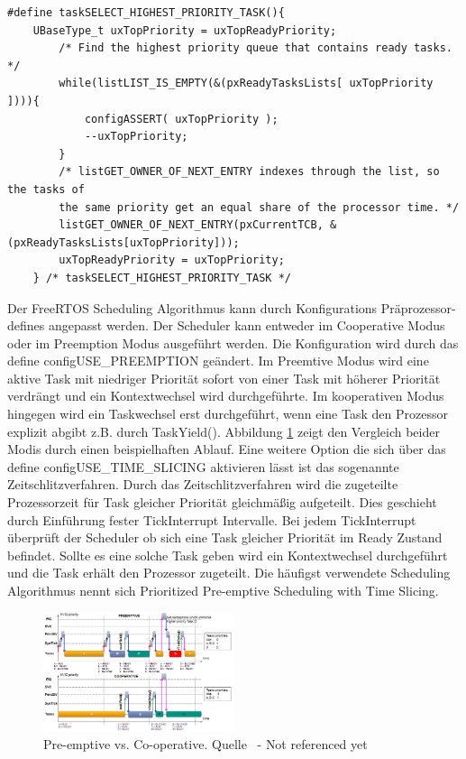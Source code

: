 \begin{lstlisting}[caption={FreeRTOS Source zur Priroty Task Selection aus Task.c. Alle lauffähigen Task werden in einem Array vewaltet pxReadyTaskLists. Die Listen verwalten sich durch Referenz-Pointer in den TCBs der einzelnen Tasks}, linewidth=8cm,captionpos=b, label=lst:nextTask, float=hbt]
#define taskSELECT_HIGHEST_PRIORITY_TASK(){																									
	UBaseType_t uxTopPriority = uxTopReadyPriority;														
		/* Find the highest priority queue that contains ready tasks. */								
		while(listLIST_IS_EMPTY(&(pxReadyTasksLists[ uxTopPriority ]))){																								
			configASSERT( uxTopPriority );																
			--uxTopPriority;																			
		}																								
		/* listGET_OWNER_OF_NEXT_ENTRY indexes through the list, so the tasks of						
		the	same priority get an equal share of the processor time. */									
		listGET_OWNER_OF_NEXT_ENTRY(pxCurrentTCB, &(pxReadyTasksLists[uxTopPriority]));			
		uxTopReadyPriority = uxTopPriority;																
	} /* taskSELECT_HIGHEST_PRIORITY_TASK */
\end{lstlisting}
Der FreeRTOS Scheduling Algorithmus kann durch Konfigurations Präprozessor-defines angepasst werden. Der Scheduler kann entweder im Cooperative Modus oder im Preemption Modus ausgeführt werden. Die Konfiguration wird durch das define configUSE\_PREEMPTION geändert. Im Preemtive Modus wird eine aktive Task mit niedriger Priorität sofort von einer Task mit höherer Priorität verdrängt und ein Kontextwechsel wird durchgeführte. Im kooperativen Modus hingegen wird ein Taskwechsel erst durchgeführt, wenn eine Task den Prozessor explizit abgibt z.B. durch TaskYield(). Abbildung \ref{fig:PreVSCo} zeigt den Vergleich beider Modis durch einen beispielhaften Ablauf. Eine weitere Option die sich über das define configUSE\_TIME\_SLICING aktivieren lässt ist das sogenannte Zeitschlitzverfahren. Durch das Zeitschlitzverfahren wird die zugeteilte Prozessorzeit für Task gleicher Priorität gleichmäßig aufgeteilt. Dies geschieht durch Einführung fester TickInterrupt Intervalle. Bei jedem TickInterrupt überprüft der Scheduler ob sich eine Task gleicher Priorität im Ready Zustand befindet. Sollte es eine solche Task geben wird ein Kontextwechsel durchgeführt und die Task erhält den Prozessor zugeteilt. Die häufigst verwendete Scheduling Algorithmus nennt sich Prioritized Pre-emptive Scheduling with Time Slicing.
\begin{figure}[ht!]
	\centering
		\includegraphics[width=0.5\textwidth]{Pictures/EMCUIT/PreemptiveCooperative.png}
	\caption{Pre-emptive vs. Co-operative. Quelle~\protect{} - Not referenced yet}
	\label{fig:PreVSCo}
\end{figure}

